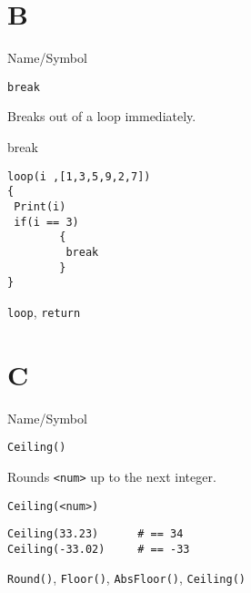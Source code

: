 \rl

\section{B}
\rl


\begin{desc}{Name/Symbol}
\item[Name/Symbol]  	\verb+break+

\item[Description]  	Breaks out of a loop immediately.

\item[Usage]        	break

\item[Example]
\begin{verbatim}
loop(i ,[1,3,5,9,2,7])
{
 Print(i)
 if(i == 3) 
        {
         break
        }
}
\end{verbatim}

\item[See Also]   	\verb+loop+, \verb+return+
\end{desc}

\rl


\section{C}
\rl


\begin{desc}{Name/Symbol}
\item[Name/Symbol]  	\verb+Ceiling()+

\item[Description] 	Rounds \verb+<num>+ up to the next integer.

\item[Usage]
\begin{verbatim}
Ceiling(<num>)
\end{verbatim}

\item[Example] 
\begin{verbatim}
Ceiling(33.23)  	# == 34
Ceiling(-33.02) 	# == -33
\end{verbatim}

\item[See Also]     	\verb+Round()+, \verb+Floor()+, \verb+AbsFloor()+, \verb+Ceiling()+
\end{desc}

\rl

